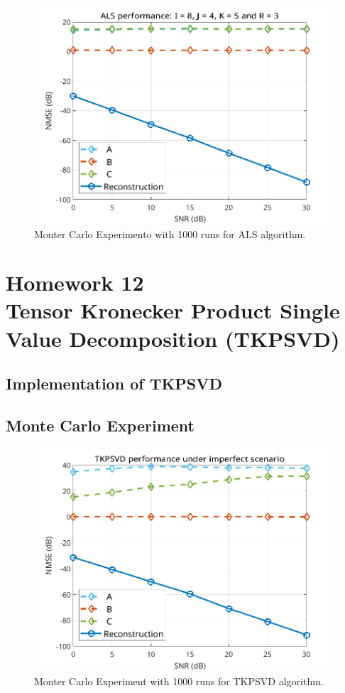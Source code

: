 \documentclass[a4paper,10pt]{article}
\begin{document}
    \begin{figure}[ht!]
        \centering 
        \includegraphics[width=0.75\linewidth]{figs/hw11a2.png} \par 
        \caption{Monter Carlo Experimento with 1000 runs for ALS algorithm.}
        \label{fig:hw11a2} 
    \end{figure}

\newpage
\section*{Homework 12 \\ Tensor Kronecker Product Single Value Decomposition (TKPSVD)}

    \subsection*{Implementation of TKPSVD}

    \subsection*{Monte Carlo Experiment}

    \begin{figure}[ht!]
        \centering 
        \includegraphics[width=0.75\linewidth]{figs/hw12.png} \par 
        \caption{Monter Carlo Experiment with 1000 runs for TKPSVD algorithm.}
        \label{fig:hw12} 
    \end{figure}
\end{document}
